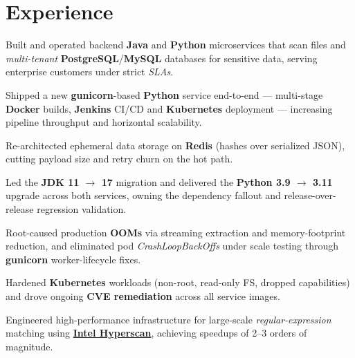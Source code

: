 \documentclass[]{openfont}
\begin{document}
\begin{minipage}[t]{0.65\textwidth}


    \section{Experience}
    \vspace{\topsep}
    \begin{tightemize}
        \item Built and operated backend \textbf{Java} and \textbf{Python} microservices that scan files and \textit{multi-tenant} \textbf{PostgreSQL}/\textbf{MySQL} databases for sensitive data, serving enterprise customers under strict \textit{SLAs}.
        \item Shipped a new \textbf{gunicorn}-based \textbf{Python} service end-to-end --- multi-stage \textbf{Docker} builds, \textbf{Jenkins} CI/CD and \textbf{Kubernetes} deployment --- increasing pipeline throughput and horizontal scalability.
        \item Re-architected ephemeral data storage on \textbf{Redis} (hashes over serialized JSON), cutting payload size and retry churn on the hot path.
        \item Led the \textbf{JDK 11 $\rightarrow$ 17} migration and delivered the \textbf{Python 3.9 $\rightarrow$ 3.11} upgrade across both services, owning the dependency fallout and release-over-release regression validation.
        \item Root-caused production \textbf{OOMs} via streaming extraction and memory-footprint reduction, and eliminated pod \textit{CrashLoopBackOffs} under scale testing through \textbf{gunicorn} worker-lifecycle fixes.
        \item Hardened \textbf{Kubernetes} workloads (non-root, read-only FS, dropped capabilities) and drove ongoing \textbf{CVE remediation} across all service images.
    \end{tightemize}
    \sectionsep

    \begin{tightemize}
        \item Engineered high-performance infrastructure for large-scale \textit{regular-expression} matching using \href{https://www.intel.com/content/www/us/en/developer/articles/technical/introduction-to-hyperscan.html}{\textbf{Intel Hyperscan}}, achieving speedups of 2--3 orders of magnitude.
    \end{tightemize}
    \sectionsep


\end{minipage}
\end{document}
